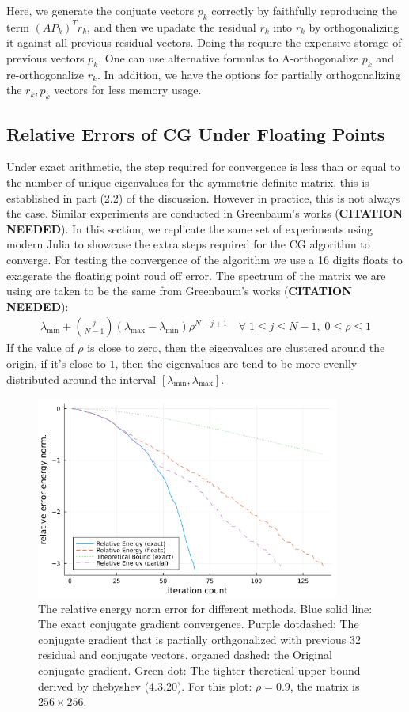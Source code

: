 \documentclass[]{article}
\theoremstyle{definition}
\begin{document}
        Here, we generate the conjuate vectors $p_k$ correctly by faithfully reproducing the term $(AP_k)^T\overline{r}_k$, and then we upadate the residual $\overline{r}_k$ into $r_k$ by orthogonalizing it against all previous residual vectors. Doing ths require the expensive storage of previous vectors $p_k$. One can use alternative formulas to A-orthogonalize $p_k$ and re-orthogonalize $r_k$. In addition, we have the options for partially orthogonalizing the $r_k, p_k$ vectors for less memory usage. 

    \subsection{Relative Errors of CG Under Floating Points}
        Under exact arithmetic, the step required for convergence is less than or equal to the number of unique eigenvalues for the symmetric definite matrix, this is established in part (2.2) of the discussion. However in practice, this is not always the case. Similar experiments are conducted in Greenbaum's works (\textbf{CITATION NEEDED}). In this section, we replicate the same set of experiments using modern Julia to showcase the extra steps required for the CG algorithm to converge. For testing the convergence of the algorithm we use a 16 digits floats to exagerate the floating point roud off error. The spectrum of the matrix we are using are taken to be the same from Greenbaum's works (\textbf{CITATION NEEDED}): 
        \begin{align}
            \lambda_{\min} + \left(
                \frac{j}{N - 1}
            \right)(\lambda_{\max} - \lambda_{\min})\rho^{N - j + 1}\quad \forall\; 1 \le j \le N - 1, \; 0 \le \rho \le 1
        \end{align}
        If the value of $\rho$ is close to zero, then the eigenvalues are clustered around the origin, if it's close to $1$, then the eigenvalues are tend to be more evenlly distributed around the interval $[\lambda_{\min}, \lambda_{\max}]$. 
        \begin{figure}[h]\label{fig:1}
            \centering
            \includegraphics[width=10cm]{fig1.png}
            \caption{
                The relative energy norm error for different methods. Blue solid line: The exact conjugate gradient convergence. Purple dotdashed: The conjugate gradient that is partially orthgonalized with previous 32 residual and conjugate vectors. organed dashed: the Original conjugate gradient. Green dot: The tighter theretical upper bound derived by chebyshev (4.3.20). For this plot: $\rho = 0.9$, the matrix is $256\times 256$. 
            }
        \end{figure}
\end{document}
